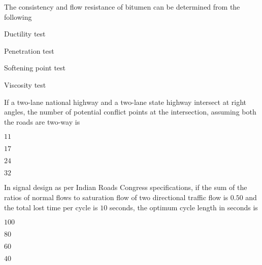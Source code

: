\iffalse
	\title{2007-CE-18-34}
	\author{EE24Btech11024 - G. Abhimanyu Koushik}
	\section{ce}
	\chapter{2007}
\fi

\item The consistency and flow resistance of bitumen can be determined from the following

\hfill{}
\begin{enumerate}
\begin{multicols}{4}
\item Ductility test
\item Penetration test
\item Softening point test
\item Viscosity test
\end{multicols}
\end{enumerate}

\item If a two-lane national highway and a two-lane state highway intersect at right angles, the number of potential conflict points at the intersection, assuming both the roads are two-way is

\hfill{}
\begin{enumerate}
\begin{multicols}{4}
\item $11$
\item $17$
\item $24$
\item $32$
\end{multicols}
\end{enumerate}

\item In signal design as per Indian Roads Congress specifications, if the sum of the ratios of normal flows to saturation flow of two directional traffic flow is $0.50$ and the total lost time per cycle is $10$ seconds, the optimum cycle length in seconds is

\hfill{}
\begin{enumerate}
\begin{multicols}{4}
\item $100$
\item $80$
\item $60$
\item $40$
\end{multicols}
\end{enumerate}

